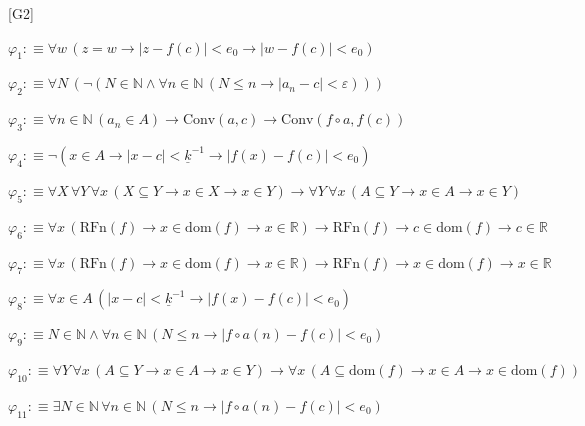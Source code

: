 \begin{fullproof}{[G2]}
\begin{ptree}
\noLine
{}
\noLine
{}
\end{ptree}
\begin{abbrevlist}
\item $\varphi_{1} :\equiv \forall w\,(z = w \to \lvert z - f(c) \rvert < e_{0} \to \lvert w - f(c) \rvert < e_{0})$
\item $\varphi_{2} :\equiv \forall N\,(\neg (N \in \mathbb{N} \land \forall n \in \mathbb{N}\,(N \leq n \to \lvert a_{n} - c \rvert < \varepsilon)))$
\item $\varphi_{3} :\equiv \forall n \in \mathbb{N}\,(a_{n} \in A) \to \mathrm{Conv}(a,c) \to \mathrm{Conv}(f \circ a,f(c))$
\item $\varphi_{4} :\equiv \neg (x \in A \to \lvert x - c \rvert < \underline{k}^{-1} \to \lvert f(x) - f(c) \rvert < e_{0})$
\item $\varphi_{5} :\equiv \forall X\,\forall Y\,\forall x\,(X \subseteq Y \to x \in X \to x \in Y) \to \forall Y\,\forall x\,(A \subseteq Y \to x \in A \to x \in Y)$
\item $\varphi_{6} :\equiv \forall x\,(\mathrm{RFn}(f) \to x \in \mathrm{dom}(f) \to x \in \mathbb{R}) \to \mathrm{RFn}(f) \to c \in \mathrm{dom}(f) \to c \in \mathbb{R}$
\item $\varphi_{7} :\equiv \forall x\,(\mathrm{RFn}(f) \to x \in \mathrm{dom}(f) \to x \in \mathbb{R}) \to \mathrm{RFn}(f) \to x \in \mathrm{dom}(f) \to x \in \mathbb{R}$
\item $\varphi_{8} :\equiv \forall x \in A\,(\lvert x - c \rvert < \underline{k}^{-1} \to \lvert f(x) - f(c) \rvert < e_{0})$
\item $\varphi_{9} :\equiv N \in \mathbb{N} \land \forall n \in \mathbb{N}\,(N \leq n \to \lvert f \circ a(n) - f(c) \rvert < e_{0})$
\item $\varphi_{10} :\equiv \forall Y\,\forall x\,(A \subseteq Y \to x \in A \to x \in Y) \to \forall x\,(A \subseteq \mathrm{dom}(f) \to x \in A \to x \in \mathrm{dom}(f))$
\item $\varphi_{11} :\equiv \exists N \in \mathbb{N}\,\forall n \in \mathbb{N}\,(N \leq n \to \lvert f \circ a(n) - f(c) \rvert < e_{0})$

\end{abbrevlist}
\end{fullproof}

